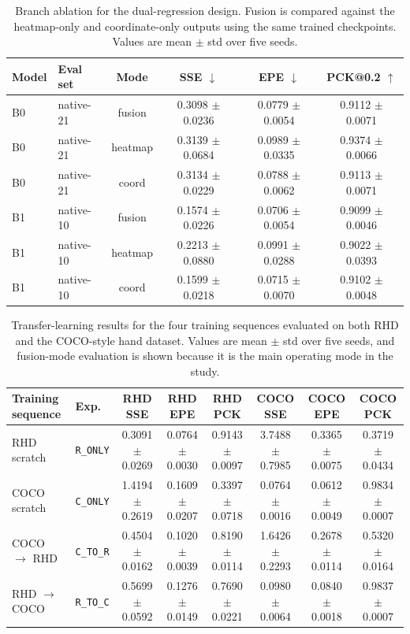 \documentclass[10pt,letterpaper]{article}
\begin{document}
\begin{table}[H]
\centering
\footnotesize
\caption{Branch ablation for the dual-regression design. Fusion is compared against the heatmap-only and coordinate-only outputs using the same trained checkpoints. Values are mean $\pm$ std over five seeds.}
\label{tab:branch_ablation}
\begin{tabular}{llcccc}
\toprule
Model & Eval set & Mode & SSE $\downarrow$ & EPE $\downarrow$ & PCK@0.2 $\uparrow$ \\
\midrule
B0 & native-21 & fusion & 0.3098 $\pm$ 0.0236 & 0.0779 $\pm$ 0.0054 & 0.9112 $\pm$ 0.0071 \\
B0 & native-21 & heatmap & 0.3139 $\pm$ 0.0684 & 0.0989 $\pm$ 0.0335 & 0.9374 $\pm$ 0.0066 \\
B0 & native-21 & coord & 0.3134 $\pm$ 0.0229 & 0.0788 $\pm$ 0.0062 & 0.9113 $\pm$ 0.0071 \\
B1 & native-10 & fusion & 0.1574 $\pm$ 0.0226 & 0.0706 $\pm$ 0.0054 & 0.9099 $\pm$ 0.0046 \\
B1 & native-10 & heatmap & 0.2213 $\pm$ 0.0880 & 0.0991 $\pm$ 0.0288 & 0.9022 $\pm$ 0.0393 \\
B1 & native-10 & coord & 0.1599 $\pm$ 0.0218 & 0.0715 $\pm$ 0.0070 & 0.9102 $\pm$ 0.0048 \\
\bottomrule
\end{tabular}
\end{table}

\begin{table}[H]
\centering
\footnotesize
\caption{Transfer-learning results for the four training sequences evaluated on both RHD and the COCO-style hand dataset. Values are mean $\pm$ std over five seeds, and fusion-mode evaluation is shown because it is the main operating mode in the study.}
\label{tab:transfer_learning}
\begin{tabular}{llcccccc}
\toprule
Training sequence & Exp. & RHD SSE & RHD EPE & RHD PCK & COCO SSE & COCO EPE & COCO PCK \\
\midrule
RHD scratch & \texttt{R\_ONLY} & 0.3091 $\pm$ 0.0269 & 0.0764 $\pm$ 0.0030 & 0.9143 $\pm$ 0.0097 & 3.7488 $\pm$ 0.7985 & 0.3365 $\pm$ 0.0075 & 0.3719 $\pm$ 0.0434 \\
COCO scratch & \texttt{C\_ONLY} & 1.4194 $\pm$ 0.2619 & 0.1609 $\pm$ 0.0207 & 0.3397 $\pm$ 0.0718 & 0.0764 $\pm$ 0.0016 & 0.0612 $\pm$ 0.0049 & 0.9834 $\pm$ 0.0007 \\
COCO $\rightarrow$ RHD & \texttt{C\_TO\_R} & 0.4504 $\pm$ 0.0162 & 0.1020 $\pm$ 0.0039 & 0.8190 $\pm$ 0.0114 & 1.6426 $\pm$ 0.2293 & 0.2678 $\pm$ 0.0114 & 0.5320 $\pm$ 0.0164 \\
RHD $\rightarrow$ COCO & \texttt{R\_TO\_C} & 0.5699 $\pm$ 0.0592 & 0.1276 $\pm$ 0.0149 & 0.7690 $\pm$ 0.0221 & 0.0980 $\pm$ 0.0064 & 0.0840 $\pm$ 0.0018 & 0.9837 $\pm$ 0.0007 \\
\bottomrule
\end{tabular}
\end{table}
\end{document}
